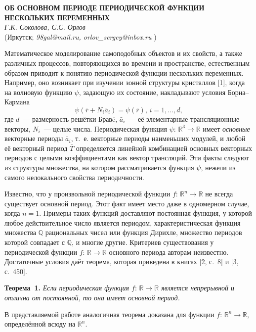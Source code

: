 \begin{center}{ \bf ОБ ОСНОВНОМ ПЕРИОДЕ ПЕРИОДИЧЕСКОЙ ФУНКЦИИ НЕСКОЛЬКИХ ПЕРЕМЕННЫХ}\\
{\it Г.К. Соколова, С.С. Орлов } \\
(Иркутск; {\it 98gal@mail.ru, orlov{\_}sergey@inbox.ru} )
\end{center}

Математическое моделирование самоподобных объектов и их свойств, а также различных процессов, повторяющихся во времени и пространстве, естественным образом приводит к понятию  периодической функции нескольких переменных. Например, оно возникает при изучении  зонной структуры кристаллов [1], когда на волновую функцию
$\psi$, задающую их состояние, накладывают условия Борна--Кармана
$$
\psi(\bar{r}+N_{i}\bar{a}_{i})=\psi(\bar{r}),\,i=1,\ldots,d,
$$
где $d$~--- размерность решётки Брав{\'e},
$\bar{a}_{i}$~--- её элементарные трансляционные векторы,
$N_{i}$~--- целые числа.
Периодическая функция $\psi:\,{\mathbb R}^{3}\to{\mathbb R}$ имеет {\it основные} векторные периоды $\bar{a}_{i}$,
т.~е. векторные периоды наименьших модулей,
и любой её векторный период $\bar{T}$ определяется линейной комбинацией основных векторных периодов с целыми коэффициентами
как вектор трансляций.
Эти факты следуют из структуры множества, на котором рассматривается функция $\psi$,
нежели из самого нелокального свойства периодичности.

Известно, что у произвольной периодической функции $f:\,{\mathbb R}^{n}\to{\mathbb R}$ не всегда существует основной период. Этот факт имеет место даже в одномерном случае, когда $n=1$. Примеры таких функций  доставляют  постоянная функция, у которой любое действительное число является периодом, характеристическая функция множества ${\mathbb Q}$ рациональных чисел или функция Дирихле, множество периодов которой совпадает с ${\mathbb Q}$, и многие другие. Критериев существования у периодической функции $f:\,{\mathbb R}\to {\mathbb R}$ основного периода авторам неизвестно. Достаточные условия даёт теорема, которая приведена в книгах [2, с.~8] и [3, с.~450].

\textbf{Теорема~1.} {\it Если периодическая функция $f:\,{\mathbb R}\to {\mathbb R}$ является непрерывной и отлична от постоянной, то она имеет основной период.}

В представляемой работе аналогичная теорема доказана для функции  $f:\,{\mathbb R}^{n}\to {\mathbb R}$, определённой всюду на ${\mathbb R}^{n}$.

